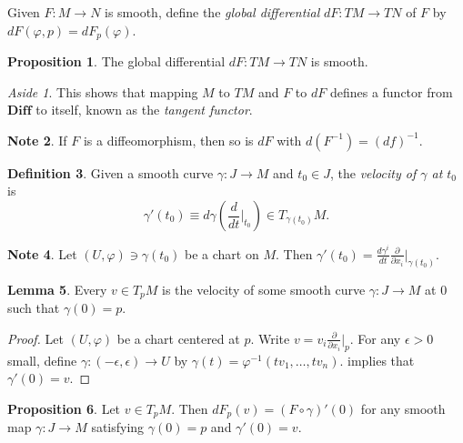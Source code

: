 \documentclass[10pt,letterpaper,cm]{nupset}
\theoremstyle{definition}
\newtheorem{definition}{Definition}[subsection]
\newtheorem{note}[definition]{Note}
\theoremstyle{theorem}
\newtheorem{lemma}[definition]{Lemma}
\newtheorem{prop}[definition]{Proposition}
\theoremstyle{remark}
\newtheorem*{aside}{Aside}
\newcommand{\1}{\mathbf{1}}
\newcommand{\0}{\vec 0}
\begin{document}
\medskip

Given $F: M \to N$ is smooth, define the \textit{global differential} $dF: TM \to TN$ of $F$ by $dF(\varphi, p) = dF_p(\varphi)$.


\begin{prop}
The global differential $dF: TM \to TN$ is smooth.
\end{prop}

\begin{aside}
This shows that mapping $M$ to $TM$ and $F$ to $dF$ defines a functor from $\mathbf{Diff}$ to itself, known as the \textit{tangent functor}.
\end{aside}

\begin{note}
If $F$ is a diffeomorphism, then so is $dF$ with $d(F^{-1}) = \left(df\right)^{-1}$.
\end{note}

\bigskip

\begin{definition}
Given a smooth curve $\gamma : J \to M$ and $t_0 \in J$, the \textit{velocity of $\gamma$ at $t_0$} is  $$\gamma'(t_0) \equiv d\gamma \left(\frac{d}{dt}\bigr\rvert_{t_0} \right) \in T_{\gamma(t_0)}M.$$
\end{definition}

\begin{note}\label{rem}
Let $\left(U, \varphi\right) \ni \gamma(t_0)$ be a chart on $M$. Then $\gamma'(t_0) = \frac{d\gamma^i}{dt} \frac{\partial}{\partial{x_i}}\bigr\rvert_{\gamma(t_0)}$.
\end{note}

\begin{lemma}
Every $v \in T_pM$ is the velocity of some smooth curve $\gamma : J \to M$ at $0$ such that $\gamma(0)=p$.
\end{lemma}
\begin{proof}
Let $\left(U, \varphi\right)$ be a chart centered at $p$. Write $v = v_i \frac{\partial}{\partial{x_i}}\bigr\rvert_{p}$. For any $\epsilon >0$ small, define $\gamma: \left({-\epsilon} , \epsilon\right) \to U$ by $\gamma(t) = \varphi^{-1}(tv_1, \ldots, tv_n)$.  implies that $\gamma'(0) = v$.
\end{proof}

\begin{prop}
Let $v \in T_pM$. Then $dF_p(v) = (F \circ \gamma)'(0)$ for any smooth map $\gamma : J \to M$ satisfying $\gamma(0)=p$ and $\gamma'(0) =v$.
\end{prop}
\end{document}
